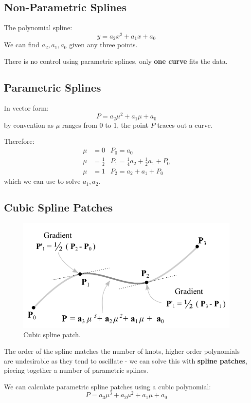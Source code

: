 \documentclass[11pt]{article}
\begin{document}
\subsection{Non-Parametric Splines}
The polynomial spline:
\[
  y = a_2 x^2 + a_1 x + a_0 
\]
We can find $a_2, a_1, a_0$ given any three points.

There is no control using parametric splines, only \textbf{one curve} fits the data.

\subsection{Parametric Splines}
In vector form:
\[
  P = a_2 \mu^2 + a_1 \mu + a_0 
\]
by convention as $\mu$ ranges from 0 to 1, the point $P$ traces out a curve.

Therefore:
\begin{align*}
  \mu &= 0 & P_0 = a_0 \\
  \mu &= \frac{1}{2} & P_1 = \frac{1}{4}a_2 + \frac{1}{2}a_1 + P_0 \\
  \mu &= 1 & P_2 = a_2 + a_1 + P_0
\end{align*}
which we can use to solve $a_1, a_2$.

\subsection{Cubic Spline Patches}
\begin{figure}[htb!]
  \centering
  \caption{Cubic spline patch.}
  \includegraphics[scale=0.5]{splinepatches}
\end{figure}
The order of the spline matches the number of knots, higher order polynomials are undesirable as they tend to oscillate - we can solve this with \textbf{spline patches}, piecing together a number of parametric splines.

We can calculate parametric spline patches using a cubic polynomial:
\[
  P = a_3 \mu^3 + a_2 \mu^2 + a_1 \mu + a_0 
\]
\end{document}
